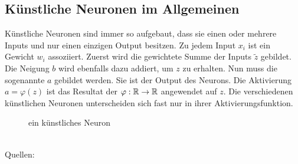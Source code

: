 \subsection{Künstliche Neuronen im Allgemeinen}
Künstliche Neuronen sind immer so aufgebaut, dass sie einen oder mehrere Inputs
und nur einen einzigen Output besitzen. Zu jedem Input $x_i$ ist ein Gewicht
$w_{i}$ assoziiert. Zuerst wird die gewichtete Summe der Inputs $\tilde{z}$ gebildet.
Die Neigung $b$ wird ebenfalls dazu addiert, um $z$ zu erhalten. Nun muss
die sogenannte  $a$ gebildet werden. Sie ist der Output des Neurons.
Die Aktivierung $a = \varphi(z)$ ist das Resultat der
 $\varphi: \mathbb{R} \to \mathbb{R}$ angewendet
auf $z$. Die verschiedenen künstlichen Neuronen unterscheiden
sich fast nur in ihrer Aktivierungsfunktion.
\\
\begin{figure}[h!]
  \centering
  \caption{ein künstliches Neuron}
\end{figure}
\\

\para{}
Quellen: \cite{Nielsen} \cite{wiki:kuenstliches_neuron} \cite{book:hands-on}

